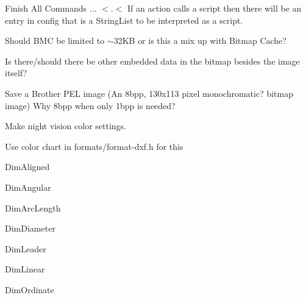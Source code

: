 \begin{DoxyRefList}
Finish All Commands ... \texorpdfstring{$<$}{<}.\texorpdfstring{$<$}{<} If an action calls a script then there will be an entry in config that is a String\+List to be interpreted as a script. 
\item[Member \mbox{\hyperlink{classMdiWindow_a2167cf71975c040208ae05b7b6b10a2f}{Mdi\+Window\+::save\+BMC}} ()]\label{todo__todo000020}%
%
Should BMC be limited to $\sim$32\+KB or is this a mix up with Bitmap Cache? 



Is there/should there be other embedded data in the bitmap besides the image itself? 

\label{todo__todo000019}%
%
Save a Brother PEL image (An 8bpp, 130x113 pixel monochromatic? bitmap image) Why 8bpp when only 1bpp is needed? 
\item[Member \mbox{\hyperlink{mainwindow_8cpp_a9ae7b1e4de8bb7661879f4317d6d3cb9}{night\+\_\+vision\+\_\+action}} (String args)]\label{todo__todo000016}%
%
Make night vision color settings.  
\item[Member \mbox{\hyperlink{embroidermodder_8h_a29bcbce98e36705fa9c1577a227d53c0a21cbc22cd57ac906315fac3d245a25b9}{OBJ\+\_\+\+LTYPE}} ]\label{todo__todo000011}%
%
Use color chart in formats/format-\/dxf.\+h for this  
\item[Member \mbox{\hyperlink{classPropertyEditor_af677b799a39d2374c702087e23fb6b3c}{Property\+Editor\+::clear\+All\+Fields}} ()]\label{todo__todo000035}%
%
Dim\+Aligned 



Dim\+Angular 



Dim\+Arc\+Length 



Dim\+Diameter 



Dim\+Leader 



Dim\+Linear 



Dim\+Ordinate 




\end{DoxyRefList}
